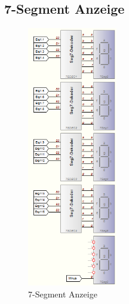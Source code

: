 \documentclass[a4paper,12pt,fleqn,oneside]{article}
\begin{document}
	\subsection{7-Segment Anzeige}
		\begin{figure}[h]
			\center
			\includegraphics[width=0.35\textwidth]{7_segment_anzeige}
			\caption{7-Segment Anzeige}
			\label{fig:7_segment_anzeige}
		\end{figure}
		\FloatBarrier
\end{document}
